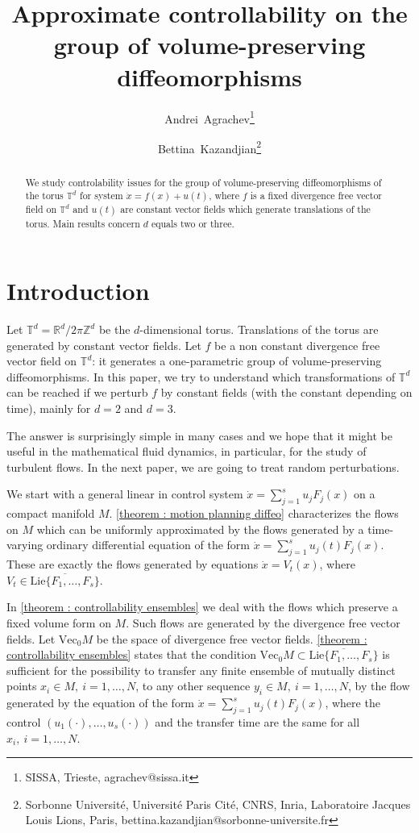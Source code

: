\documentclass[10pt]{article}
\title{Approximate controllability on the group of volume-preserving diffeomorphisms}
\author{Andrei~Agrachev\thanks{SISSA, Trieste, agrachev@sissa.it} \and Bettina~Kazandjian\thanks{Sorbonne Université, Université Paris Cité, CNRS, Inria, Laboratoire Jacques Louis Lions, Paris, bettina.kazandjian@sorbonne-universite.fr}}
\date{}
\begin{document}
\maketitle

\begin{abstract} We study controlability issues for the group of volume-preserving diffeomorphisms of the torus $\mathbb T^d$ for system
$\dot x=f(x)+u(t)$, where $f$ is a fixed divergence free vector field on $\mathbb T^d$ and $u(t)$ are constant vector fields which generate translations of the torus. Main results concern $d$ equals two or three.
\end{abstract}

\tableofcontents

\section{Introduction} Let $\mathbb T^d=\mathbb R^d/2\pi\mathbb Z^d$ be the $d$-dimensional torus. Translations of the torus are generated by constant vector fields. Let $f$ be a non constant divergence free vector field on $\mathbb T^d$: it generates a one-parametric group of
volume-preserving diffeomorphisms. In this paper, we try to understand which transformations of $\mathbb T^d$ can be reached if we perturb $f$
by constant fields (with the constant depending on time), mainly for $d=2$ and $d=3$.  

The answer is surprisingly simple in many cases and we hope that it might be useful in the mathematical fluid dynamics, in particular, for
the study of turbulent flows. In the next paper, we are going to treat random perturbations.

We start with a general linear in control system $\dot x=\sum\limits_{j=1}^su_jF_j(x)$ on a compact manifold $M$. \cref{theorem : motion planning diffeo} characterizes
the flows on $M$ which can be uniformly approximated by the flows generated by a time-varying ordinary differential equation of the form
 $\dot x=\sum\limits_{j=1}^su_j(t)F_j(x)$. These are exactly the flows generated by equations $\dot x=V_t(x)$, where 
 $V_t\in\overline{\mathrm{Lie}\{F_1,\ldots,F_s\}}$.
 
In \cref{theorem : controllability ensembles} we deal with the flows which preserve a fixed volume form on $M$. Such flows are generated by the divergence free vector fields.
Let $\mathrm{Vec}_0M$ be the space of divergence free vector fields.  \cref{theorem : controllability ensembles} states that the condition 
$\mathrm{Vec}_0M\subset\overline{\mathrm{Lie}\{F_1,\ldots,F_s\}}$ is sufficient for the possibility to transfer any finite ensemble of mutually
distinct points $x_i\in M,\ i=1,\ldots,N$, to any other sequence $y_i\in M,\ i=1,\ldots,N$, by the flow generated by the equation of the form
$\dot x=\sum\limits_{j=1}^su_j(t)F_j(x)$, where the control $(u_1(\cdot),\ldots,u_s(\cdot))$ and the transfer time are the same for all 
$x_i,\ i=1,\ldots,N$.
\end{document}
